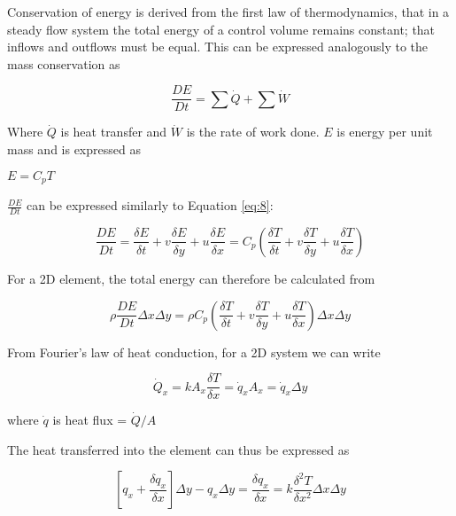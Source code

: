    Conservation of energy is derived from the first law of thermodynamics, that in a steady flow system the total energy of a control volume remains constant; that inflows and outflows must be equal. This can be expressed analogously to the mass conservation as 

    \begin{equation} \label{eq:10}
      \frac{DE}{Dt} = \sum{\dot{Q}} + \sum{\dot{W}}
    \end{equation}

    Where $\dot{Q}$ is heat transfer and $\dot{W}$ is the rate of work done. $E$ is energy per unit mass and is expressed as

    \centerline{$E = C_{p} T$}

    $\frac{DE}{Dt}$ can be expressed similarly to Equation \ref{eq:8}:

    \begin{equation} \label{eq:11}
      \frac{DE}{Dt} = \frac{\delta E}{\delta t} + v \frac{\delta E}{\delta y} + u \frac{\delta E}{\delta x} = C_{p} (\frac{\delta T}{\delta t} + v \frac{\delta T}{\delta y} + u \frac{\delta T}{\delta x})
    \end{equation}

    For a 2D element, the total energy can therefore be calculated from

    \begin{equation} \label{eq:12}
      \rho \frac{DE}{Dt} \Delta x \Delta y = \rho   C_{p} (\frac{\delta T}{\delta t} + v \frac{\delta T}{\delta y} + u \frac{\delta T}{\delta x}) \Delta x \Delta y
    \end{equation}

    From Fourier's law of heat conduction, for a 2D system we can write

    \begin{equation} \label{eq:13}
      \dot{Q}_{x} = k A_{x} \frac{\delta T}{\delta x} = \dot{q}_{x} A_{x} = \dot{q}_{x} \Delta y
    \end{equation}

    where $\dot{q}$ is heat flux = $\dot{Q}/A$

    The heat transferred into the element can thus be expressed as

    \begin{equation} \label{eq:14}
      [q_{x} + \frac{\delta q_{x}}{\delta x}] \Delta y - q_{x} \Delta y = \frac{\delta q_{x}}{\delta x} = k \frac{\delta^2 T}{\delta x^2} \Delta x \Delta y
    \end{equation}


